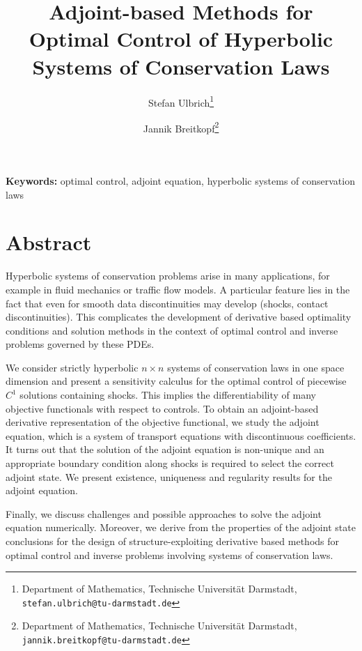 \documentclass[11pt]{article}
\title{\bfseries Adjoint-based Methods for Optimal Control of Hyperbolic
Systems of Conservation Laws}
\author{
Stefan Ulbrich\thanks{Department of Mathematics, Technische Universit\"at
Darmstadt,
\texttt{stefan.ulbrich@tu-darmstadt.de}}
\and
Jannik Breitkopf\thanks{Department of Mathematics, Technische Universit\"at
Darmstadt,
\texttt{jannik.breitkopf@tu-darmstadt.de}}
}
\date{}
\begin{document}
\maketitle

\vspace{-1em}

\noindent
\textbf{Keywords:}
optimal control, adjoint equation, hyperbolic systems of conservation laws

\vspace{0.5em}


\vspace{1em}

\section*{Abstract}

Hyperbolic systems of conservation problems arise in many applications, for
example in fluid mechanics or traffic flow models. A particular feature lies
in the fact that even for smooth data discontinuities may develop (shocks,
contact discontinuities). This complicates the development of derivative
based optimality conditions and solution methods in the context of optimal
control and inverse problems governed by these PDEs.

We consider strictly hyperbolic $n\times n$ systems of conservation laws in
one space dimension and present a sensitivity calculus for the optimal
control of piecewise $C^1$ solutions containing shocks.
This implies the differentiability of many objective
functionals with respect to controls. To obtain an adjoint-based derivative
representation of the objective functional, we study the adjoint
equation, which is a system of transport equations with discontinuous
coefficients. It turns out that the solution of the adjoint equation is
non-unique and an appropriate boundary condition along shocks is required to
select the correct adjoint state. We present existence, uniqueness and
regularity results for the adjoint equation.

Finally, we discuss challenges and possible approaches to solve the adjoint
equation numerically. Moreover, we derive from the properties of the adjoint
state conclusions for the design of structure-exploiting derivative based methods
for optimal control and inverse problems involving systems of conservation laws.

\vspace{1em}
\end{document}
